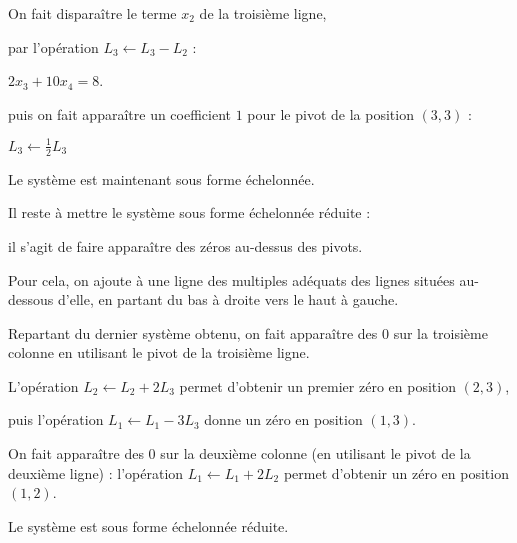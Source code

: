 \change

 On fait disparaître le terme $x_2$ de la troisième ligne,
 
\change
 
par l'opération $L_3 \leftarrow L_3 -L_2$ :

\change

$2x_3 +10x_4  = 8$.


\change
 puis on fait apparaître un coefficient $1$ pour le pivot de la position $(3,3)$ :
 
 
 \change
 
$L_3 \leftarrow \frac12 L_3$

\change

Le système est maintenant sous forme échelonnée.  



\diapo
Il reste à mettre le système sous forme échelonnée réduite :

il s'agit de faire apparaître des zéros au-dessus des pivots.

Pour cela, on ajoute à une ligne des multiples adéquats des lignes situées 
au-dessous d'elle, en partant du bas à droite vers le haut à gauche.

Repartant du dernier système obtenu, on fait apparaître des $0$ sur la troisième colonne en utilisant le pivot de la troisième ligne. 

\change

\change

\change

L'opération $L_2 \leftarrow L_2 + 2L_3$ permet d'obtenir un premier zéro en position $(2,3)$,

\change

\change

\change

puis l'opération $L_1 \leftarrow L_1 -3 L_3$ donne un zéro en position $(1,3)$.

\change

\change

\change

On fait apparaître des $0$ sur la deuxième colonne (en utilisant le pivot de la deuxième ligne) : 
l'opération $L_1 \leftarrow L_1 + 2L_2$ permet d'obtenir un zéro en position $(1,2)$.

Le système est sous forme échelonnée réduite.



\diapo

